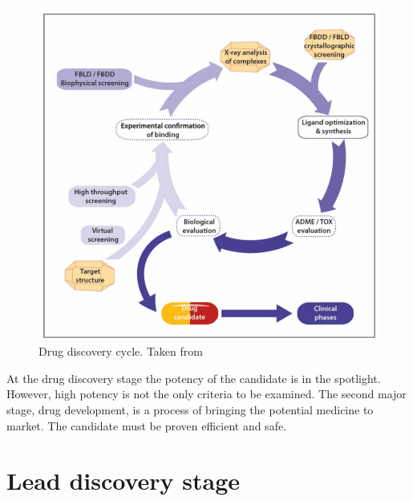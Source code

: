 
\begin{figure}
    \centering
    \includegraphics[scale = 0.4]{Images/Maveyraud.png}
    \caption{Drug discovery cycle. Taken from \cite{Maveyraud2020ProteinDiscovery}}
    \label{DrugCycle}
\end{figure}


At the drug discovery stage the potency of the candidate is in the spotlight.
However, high potency is not the only criteria to be examined. 
The second major stage, drug development, is a process of bringing the potential medicine to market.
The candidate must be proven efficient and safe.\\ 


\section{Lead discovery stage}\label{lead_disc}

